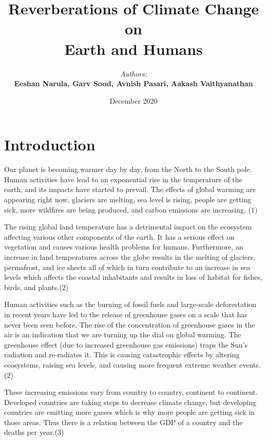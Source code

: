 \documentclass[a4paper, 11pt]{report}
\institute{CSC110 Final Project}
\title{\textbf{Reverberations of Climate Change on \\ Earth and Humans }}
\author{\textit{Authors:}\\\textbf{Eeshan Narula, Garv Sood, Avnish Pasari, Aakash Vaithyanathan}}
\date{December 2020}
\begin{document}
\maketitle
\romantableofcontents

\newpage

\chapter{Introduction}

 {Our planet is becoming warmer day by day, from the North to the South pole. Human activities have lead to an exponential rise in the temperature of the earth, and its impacts have started to prevail. The effects of global warming are appearing right now, glaciers are melting, sea level is rising, people are getting sick, more wildfires are being produced, and carbon emissions are increasing}. \scriptsize{($1$)}\\  \normalsize

  { The rising global land temperature has a detrimental impact on the ecosystem affecting various other components of the earth. It has a serious effect on vegetation and causes various health problems for humans. Furthermore, an increase in land temperatures across the globe results in the melting of glaciers, permafrost, and ice sheets all of which in turn contribute to an increase in sea levels which affects the coastal inhabitants and results in loss of habitat for fishes, birds, and plants.}\scriptsize{($2$)} \\ \normalsize

   {Human activities such as the burning of fossil fuels and large-scale deforestation in recent years have led to the release of greenhouse gases on a scale that has never been seen before. The rise of the concentration of greenhouse gases in the air is an indication that we are turning up the dial on global warming. The greenhouse effect (due to increased greenhouse gas emissions) traps the Sun’s radiation and re-radiates it. This is causing catastrophic effects by altering ecosystems, raising sea levels, and causing more frequent extreme weather events}.\scriptsize{($2$)}\\  \normalsize

    {These increasing emissions vary from country to country, continent to continent. Developed countries are taking steps to decrease climate change, but developing countries are emitting more gasses which is why more people are getting sick in those areas. Thus there is a relation between the GDP of a country and the deaths per year}.\scriptsize{($3$)} \normalsize \\
\end{document}
